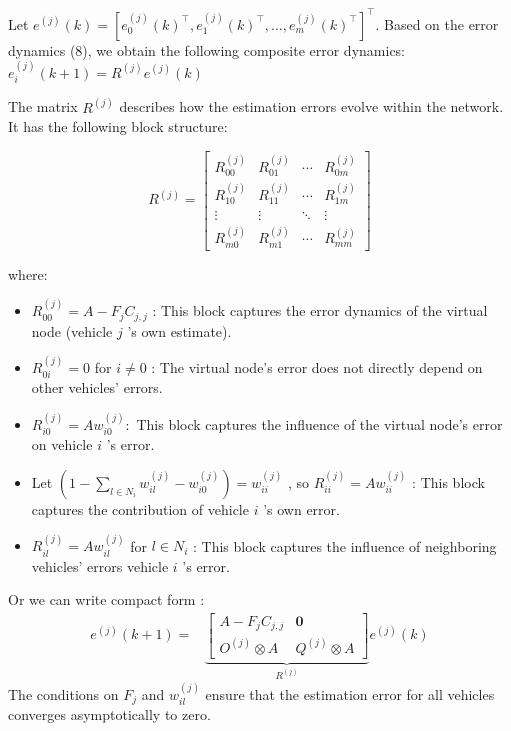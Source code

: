 \documentclass[letterpaper, 10pt, conference]{ieeeconf}  %
\begin{document}
Let $e^{(j)}(k)=\left[e_0^{(j)}(k)^{\top}, e_1^{(j)}(k)^{\top}, \ldots, e_m^{(j)}(k)^{\top}\right]^{\top}$. Based on the error dynamics (8), we obtain the following composite error dynamics:
$e_i^{(j)}(k+1) = R^{(j)} e^{(j)}(k) $

The matrix $R^{(j)}$ describes how the estimation errors evolve within the network. It has the following block structure:

$$
R^{(j)}=\left[\begin{array}{cccc}
R_{00}^{(j)} & R_{01}^{(j)} & \cdots & R_{0 m}^{(j)} \\
R_{10}^{(j)} & R_{11}^{(j)} & \cdots & R_{1 m}^{(j)} \\
\vdots & \vdots & \ddots & \vdots \\
R_{m 0}^{(j)} & R_{m 1}^{(j)} & \cdots & R_{m m}^{(j)}
\end{array}\right]
$$

where:
\begin{itemize}
    \item  $R_{00}^{(j)}=A-F_j C_{j, j}$ : This block captures the error dynamics of the virtual node (vehicle $j$ 's own estimate).
    \item $R_{0 i}^{(j)}=0$ for $i \neq 0$ : The virtual node's error does not directly depend on other vehicles' errors.
    \item $R_{i 0}^{(j)}=A w_{i 0}^{(j)}:$ This block captures the influence of the virtual node's error on vehicle $i$ 's error.
    \item Let $\left(1-\sum_{l \in N_i} w_{i l}^{(j)}-w_{i 0}^{(j)}\right) = w_{i i}^{(j)}$ 
    , so $R_{i i}^{(j)}=A w_{i i}^{(j)}$ : This block captures the contribution of vehicle $i$ 's own error. 
    \item $R_{i l}^{(j)}=A w_{i l}^{(j)}$ for $l \in N_i$ : This block captures the influence of neighboring vehicles' errors vehicle $i$ 's error.
\end{itemize}

Or we can write compact form : 
$$
\begin{aligned}
e^{(j)}(k+1)= & \underbrace{\left[\begin{array}{c|c}
A-F_j C_{j, j} & \mathbf{0} \\
\hline O^{(j)} \otimes A & Q^{(j)} \otimes A
\end{array}\right]}_{R^{(j)}} e^{(j)}(k) 
\end{aligned}
$$
The conditions on \( F_j \) and \( w_{il}^{(j)} \) ensure that the estimation error for all vehicles converges asymptotically to zero.
\end{document}
